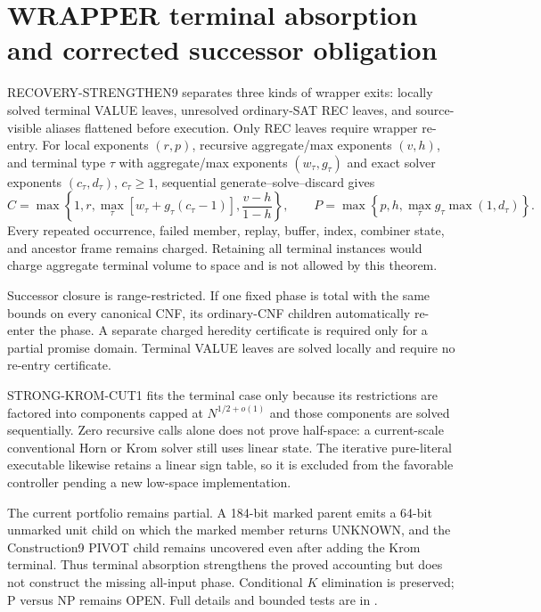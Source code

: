 \section{WRAPPER terminal absorption and corrected successor obligation}

RECOVERY-STRENGTHEN9 separates three kinds of wrapper exits: locally solved
terminal VALUE leaves, unresolved ordinary-SAT REC leaves, and source-visible
aliases flattened before execution.  Only REC leaves require wrapper
re-entry.  For local exponents $(r,p)$, recursive aggregate/max exponents
$(v,h)$, and terminal type $\tau$ with aggregate/max exponents
$(w_\tau,g_\tau)$ and exact solver exponents $(c_\tau,d_\tau)$,
$c_\tau\ge1$, sequential generate--solve--discard gives
\[
 C=\max\!\left\{1,r,
   \max_\tau[w_\tau+g_\tau(c_\tau-1)],
   \frac{v-h}{1-h}\right\},
 \qquad
 P=\max\!\left\{p,h,
   \max_\tau g_\tau\max(1,d_\tau)\right\}.
\]
Every repeated occurrence, failed member, replay, buffer, index, combiner
state, and ancestor frame remains charged.  Retaining all terminal instances
would charge aggregate terminal volume to space and is not allowed by this
theorem.

Successor closure is range-restricted.  If one fixed phase is total with the
same bounds on every canonical CNF, its ordinary-CNF children automatically
re-enter the phase.  A separate charged heredity certificate is required only
for a partial promise domain.  Terminal VALUE leaves are solved locally and
require no re-entry certificate.

STRONG-KROM-CUT1 fits the terminal case only because its restrictions are
factored into components capped at $N^{1/2+o(1)}$ and those components are
solved sequentially.  Zero recursive calls alone does not prove half-space:
a current-scale conventional Horn or Krom solver still uses linear state.
The iterative pure-literal executable likewise retains a linear sign table,
so it is excluded from the favorable controller pending a new low-space
implementation.

The current portfolio remains partial.  A 184-bit marked parent emits a
64-bit unmarked unit child on which the marked member returns UNKNOWN, and
the Construction9 PIVOT child remains uncovered even after adding the Krom
terminal.  Thus terminal absorption strengthens the proved accounting but
does not construct the missing all-input phase.  Conditional $K$ elimination
is preserved; P versus NP remains OPEN.  Full details and bounded tests are
in .
